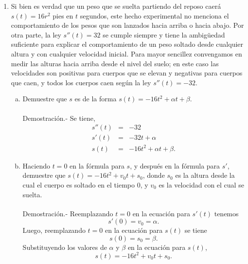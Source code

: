 \begin{enumerate}[\bfseries 1.]
\begin{enumerate}[(a)]
	\end{enumerate}

    \item Si bien es verdad que un peso que se suelta partiendo del reposo caerá $s(t) = 16r^2$ pies en $t$ segundos, este hecho experimental no menciona el comportamiento de los pesos que son lanzados hacia arriba o hacia abajo. Por otra parte, la ley $s''(t) = 32$ se cumple siempre y tiene la ambigüedad suficiente para explicar el comportamiento de un peso soltado desde cualquier altura y con cualquier velocidad inicial. Para mayor sencillez convengamos en medir las alturas hacia arriba desde el nivel del suelo; en este caso las velocidades son positivas para cuerpos que se elevan y negativas para cuerpos que caen, y todos los cuerpos caen según la ley $s''(t) = -32$.\\
	\begin{enumerate}[(a)]

	    \item Demuestre que $s$ es de la forma $s(t)=-16t^2+\alpha t + \beta.$\\\\
		Demostración.-\; Se tiene,
		$$\begin{array}{rcl}
		    s''(t)&=&-32\\
		    s'(t)&=&-32t + \alpha\\
		    s(t)&=&-16t^2+\alpha t + \beta.
		\end{array}$$
		\vspace{.5cm}

	    \item Haciendo $t=0$ en la fórmula para $s$, y después en la fórmula para $s'$, demuestre que $s(t)=-16t^2+v_0 t + s_0$, donde $s_0$ es la altura desde la cual el cuerpo es soltado en el tiempo $0$, y $v_0$ es la velocidad con el cual se suelta.\\\\
		Demostración.-\; Reemplazando $t=0$ en la ecuación para $s'(t)$ tenemos
		$$s'(0)=v_0=\alpha.$$
		Luego, reemplazando $t=0$ en la ecuación para $s(t)$ se tiene
		$$s(0)=s_0=\beta.$$
		Substituyendo los valores de $\alpha$ y $\beta$ en la ecuación para $s(t)$,
		$$s(t)=-16t^2+v_0t+s_0.$$\\


\end{enumerate}
\end{enumerate}
